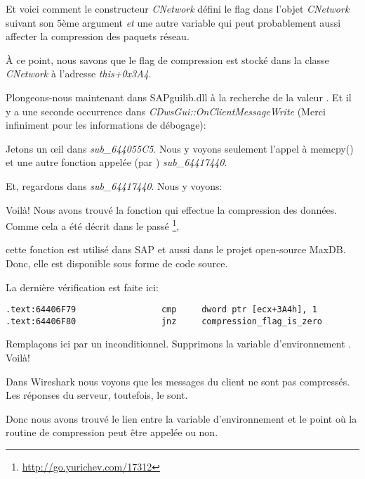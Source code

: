 Et voici comment le constructeur \emph{CNetwork} défini le flag dans l'objet \emph{CNetwork}
suivant son 5ème argument \emph{et} une autre variable qui peut probablement aussi
affecter la compression des paquets réseau.



À ce point, nous savons que le flag de compression est stocké dans la classe
\emph{CNetwork} à l'adresse \emph{this+0x3A4}.

Plongeons-nous maintenant dans SAPguilib.dll à la recherche de la valeur .
Et il y a une seconde occurrence dans \emph{CDwsGui::OnClientMessageWrite} (Merci
infiniment pour les informations de débogage):



Jetons un \oe{}il dans \emph{sub\_644055C5}. Nous y voyons seulement l'appel à memcpy()
et une autre fonction appelée (par \IDA) \emph{sub\_64417440}.

Et, regardons dans \emph{sub\_64417440}. Nous y voyons:



Voilà! Nous avons trouvé la fonction qui effectue la compression des données.
Comme cela a été décrit dans le passé
\footnote{\url{http://go.yurichev.com/17312}},

cette fonction est utilisé dans SAP et aussi dans le projet open-source MaxDB.
Donc, elle est disponible sous forme de code source.

La dernière vérification est faite ici:

\begin{lstlisting}[style=customasmx86]
.text:64406F79                 cmp     dword ptr [ecx+3A4h], 1
.text:64406F80                 jnz     compression_flag_is_zero
\end{lstlisting}

Remplaçons ici \JNZ par un \JMP inconditionnel. Supprimons la variable d'environnement
\TDWNC. Voilà!

Dans Wireshark nous voyons que les messages du client ne sont pas compressés. Les
réponses du serveur, toutefois, le sont.

Donc nous avons trouvé le lien entre la variable d'environnement et le point où la
routine de compression peut être appelée ou non.
